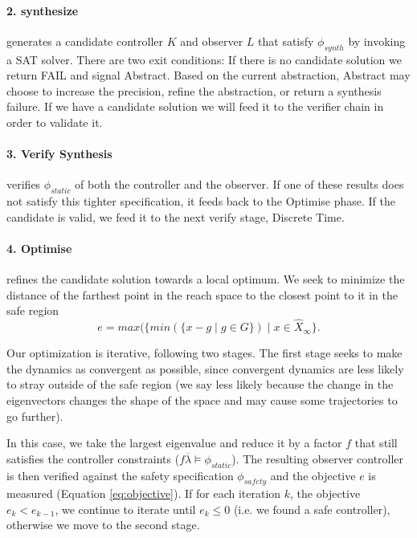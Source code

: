 \documentclass[sigconf]{llncs}
\newcommand{\mat}[1]{{#1}}
\renewcommand{\vec}[1]{{#1}}
\begin{document}
\paragraph{2. {\sc synthesize}} generates a candidate controller $\mat{K}$
and observer $\mat{L}$ that satisfy
$\phi_{synth}$ by invoking a SAT solver.
There are two exit conditions:
If there is no candidate solution we return FAIL and signal {\sc Abstract}. Based on the current abstraction,
{\sc  Abstract} may choose to increase the precision, refine the abstraction, or return a synthesis failure.
If we have a candidate solution we will feed it to the verifier chain in order to validate it.
%
\paragraph{3. {\sc Verify Synthesis}} verifies $\phi_{static}$ of  both the
controller and the observer.  If one of these results does not satisfy this tighter
specification, it feeds back to the {\sc Optimise} phase.
If the candidate is valid, we feed it to the next {\sc verify} stage, {\sc Discrete Time}. 

\paragraph{4. {\sc Optimise}} refines the candidate solution towards
a local optimum.  We seek to minimize the distance of the farthest point in the
reach space to the closest point to it in the safe region
\begin{equation}
e=max(\{min(\{\vec{x}-\vec{g} \mid \vec{g}\in G\}) \mid \vec{x} \in \hat{X}_\infty \}.
\label{eq:objective}
\end{equation}

Our optimization is iterative, following two stages.  The first stage seeks to
make the dynamics as convergent as possible, since convergent dynamics are
less likely to stray outside of the safe region (we say less likely because the
change in the eigenvectors changes the shape of the space and may cause some 
trajectories to go further).

In this case, we take the largest eigenvalue and reduce it by a factor $f$
that still satisfies the controller constraints ($f \overline{\lambda} \models \phi_{static}$).
The resulting observer controller is then verified against the safety specification $\phi_{safety}$
and the objective $e$ is measured (Equation \eqref{eq:objective}).
If for each iteration $k$, the objective $e_k<e_{k-1}$, we continue to iterate until 
$e_k \leq 0$ (i.e. we found a safe controller), otherwise we move to the second stage.
\end{document}

